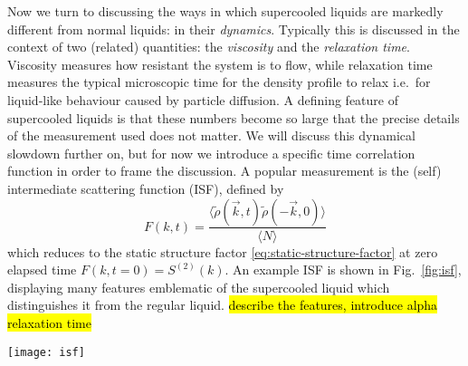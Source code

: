 Now we turn to discussing the ways in which supercooled liquids are markedly different from normal liquids: in their \emph{dynamics}.
Typically this is discussed in the context of two (related) quantities: the \emph{viscosity} and the \emph{relaxation time}.
Viscosity measures how resistant the system is to flow, while relaxation time measures the typical microscopic time for the density profile to relax i.e.\ for liquid-like behaviour caused by particle diffusion.
A defining feature of supercooled liquids is that these numbers become so large that the precise details of the measurement used does not matter.
We will discuss this dynamical slowdown further on, but for now we introduce a specific time correlation function in order to frame the discussion.
A popular measurement is the (self) intermediate scattering function (ISF), defined by \cite{JanssenFP2018}
\begin{equation}\label{eq:isf}
  F(k, t)
  =
  \frac{
    \big\langle \tilde{\rho}(\vec{k}, t) \tilde{\rho}(-\vec{k}, 0) \big\rangle
  }{
    \langle N \rangle
  }
\end{equation}
which reduces to the static structure factor \eqref{eq:static-structure-factor} at zero elapsed time $F(k, t=0) = S^{(2)}(k)$.
An example ISF is shown in Fig.\ \ref{fig:isf}, displaying many features emblematic of the supercooled liquid which distinguishes it from the regular liquid.
\hl{describe the features, introduce alpha relaxation time}

\begin{SCfigure}
  \texttt{[image: isf]}
  \caption[Intermediate scattering function in a supercooled liquid]{
    Typical intermediate scattering function in a supercooled liquid.
    The power law predictions are from mode-coupling theory.
    Reproduced from Ref.\ \cite{JanssenFP2018}.
  }
  \label{fig:isf}
\end{SCfigure}

